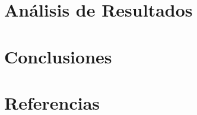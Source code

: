 \documentclass[]{article}
\begin{document}
\section{Análisis de Resultados}



\section{Conclusiones}


\section{Referencias}



\end{document}
